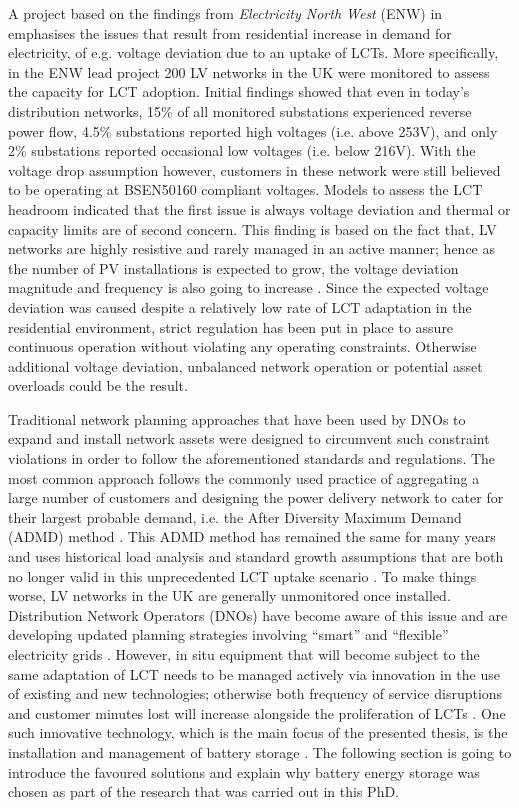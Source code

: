A project based on the findings from \textit{Electricity North West} (ENW) in \cite{ElectricityNorthWestLtd2014} emphasises the issues that result from residential increase in demand for electricity, of e.g. voltage deviation due to an uptake of LCTs.
More specifically, in the ENW lead project 200 LV networks in the UK were monitored to assess the capacity for LCT adoption.
Initial findings showed that even in today's distribution networks, 15\% of all monitored substations experienced reverse power flow, 4.5\% substations reported high voltages (i.e. above 253V), and only 2\% substations reported occasional low voltages (i.e. below 216V).
With the voltage drop assumption however, customers in these network were still believed to be operating at BSEN50160 compliant voltages.
Models to assess the LCT headroom indicated that the first issue is always voltage deviation and thermal or capacity limits are of second concern.
This finding is based on the fact that, LV networks are highly resistive and rarely managed in an active manner; hence as the number of PV installations is expected to grow, the voltage deviation magnitude and frequency is also going to increase \cite{Woyte2006}.
Since the expected voltage deviation was caused despite a relatively low rate of LCT adaptation in the residential environment, strict regulation has been put in place to assure continuous operation without violating any operating constraints.
Otherwise additional voltage deviation, unbalanced network operation or potential asset overloads could be the result.

Traditional network planning approaches that have been used by DNOs to expand and install network assets were designed to circumvent such constraint violations in order to follow the aforementioned standards and regulations.
The most common approach follows the commonly used practice of aggregating a large number of customers and designing the power delivery network to cater for their largest probable demand, i.e. the After Diversity Maximum Demand (ADMD) method \cite{Richardson2010a}.
This ADMD method has remained the same for many years and uses historical load analysis and standard growth assumptions that are both no longer valid in this unprecedented LCT uptake scenario \cite{Yunusov2016}.
To make things worse, LV networks in the UK are generally unmonitored once installed.
Distribution Network Operators (DNOs) have become aware of this issue and are developing updated planning strategies involving ``smart'' and ``flexible'' electricity grids \cite{Fang2012}.
However, in situ equipment that will become subject to the same adaptation of LCT needs to be managed actively via innovation in the use of existing and new technologies; otherwise both frequency of service disruptions and customer minutes lost will increase alongside the proliferation of LCTs \cite{Ault2008a}.
One such innovative technology, which is the main focus of the presented thesis, is the installation and management of battery storage \cite{Chen2009}.
The following section is going to introduce the favoured solutions and explain why battery energy storage was chosen as part of the research that was carried out in this PhD.


